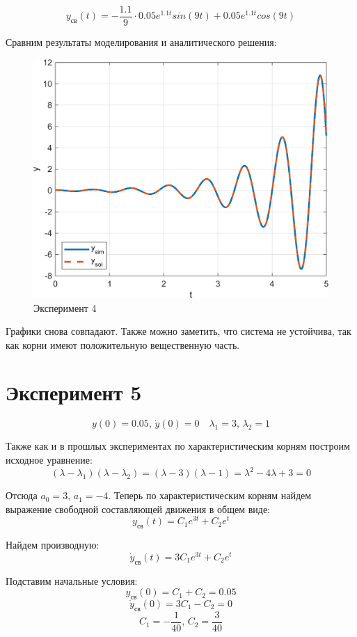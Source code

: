 \[y_{\text{св}}(t) = -\frac{1.1}{9} \cdot 0.05 e^{1.1 t} sin(9t) + 0.05 e^{1.1 t} cos(9t)\]

Сравним результаты моделирования и аналитического решения:
\begin{figure}[H]
    \centering
    \includegraphics[width=1\textwidth, trim={0cm 0cm 0cm 0cm}]{../images/1_4.png}
    \caption{Эксперимент 4}
    \label{fig:exp4}
\end{figure}

Графики снова совпадают. Также можно заметить, что система не устойчива, так как корни имеют положительную вещественную часть.
\section{Эксперимент 5}
\[y(0) = 0.05,\, \dot y(0) = 0 \quad \lambda_1 = 3,\, \lambda_2 = 1\]

Также как и в прошлых экспериментах по характеристическим корням построим исходное уравнение:
\[(\lambda - \lambda_1)(\lambda - \lambda_2) = (\lambda - 3)(\lambda - 1) = \lambda^2 - 4\lambda + 3 = 0\]

Отсюда $a_0 = 3$, $a_1 = -4$. Теперь по характеристическим корням найдем выражение свободной составляющей движения в общем виде:
\[y_{\text{св}}(t) = C_1 e^{3 t} + C_2 e^{t}\]

Найдем производную:
\[\dot y_{\text{св}}(t) = 3C_1 e^{3 t} + C_2 e^{t}\]

Подставим начальные условия:
\[y_{\text{св}}(0) = C_1 + C_2 = 0.05\]
\[\dot y_{\text{св}}(0) = 3C_1 - C_2 = 0\]
\[C_1 = -\frac{1}{40},\, C_2 = \frac{3}{40}\]

